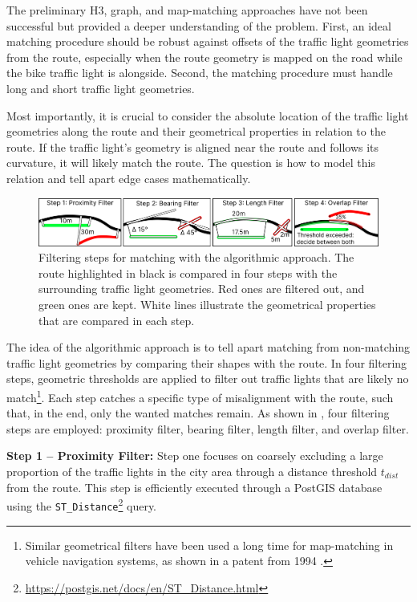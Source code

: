 The preliminary H3, graph, and map-matching approaches have not been successful but provided a deeper understanding of the problem. First, an ideal matching procedure should be robust against offsets of the traffic light geometries from the route, especially when the route geometry is mapped on the road while the bike traffic light is alongside. Second, the matching procedure must handle long and short traffic light geometries.

Most importantly, it is crucial to consider the absolute location of the traffic light geometries along the route and their geometrical properties in relation to the route. If the traffic light's geometry is aligned near the route and follows its curvature, it will likely match the route. The question is how to model this relation and tell apart edge cases mathematically.

\begin{figure}[t]
\centering
\includegraphics[width=\linewidth]{images/sg-matching-filters.pdf}
\caption{Filtering steps for matching with the algorithmic approach. The route highlighted in black is compared in four steps with the surrounding traffic light geometries. Red ones are filtered out, and green ones are kept. White lines illustrate the geometrical properties that are compared in each step.}
\label{fig:sg-matching-filters}
\end{figure}

The idea of the algorithmic approach is to tell apart matching from non-matching traffic light geometries by comparing their shapes with the route. In four filtering steps, geometric thresholds are applied to filter out traffic lights that are likely no match\footnote{Similar geometrical filters have been used a long time for map-matching in vehicle navigation systems, as shown in a patent from 1994 \cite{honey_vorrichtung_1994}.}. Each step catches a specific type of misalignment with the route, such that, in the end, only the wanted matches remain. As shown in , four filtering steps are employed: proximity filter, bearing filter, length filter, and overlap filter.

\textbf{\color{cidarkblue}Step 1 -- Proximity Filter:} Step one focuses on coarsely excluding a large proportion of the traffic lights in the city area through a distance threshold $t_{dist}$ from the route. This step is efficiently executed through a PostGIS database using the \texttt{ST\_Distance}\footnote{\url{https://postgis.net/docs/en/ST\_Distance.html}} query.

